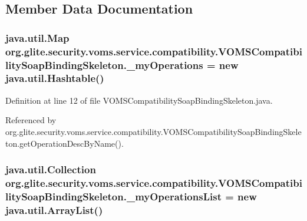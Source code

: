 \subsection{Member Data Documentation}
\hypertarget{classorg_1_1glite_1_1security_1_1voms_1_1service_1_1compatibility_1_1VOMSCompatibilitySoapBindingSkeleton_a64389624da6e025d110bdf5b8494820b}{
\subsubsection[{\_\-myOperations}]{\setlength{\rightskip}{0pt plus 5cm}java.util.Map {\bf org.glite.security.voms.service.compatibility.VOMSCompatibilitySoapBindingSkeleton.\_\-myOperations} = new java.util.Hashtable()}}
\label{classorg_1_1glite_1_1security_1_1voms_1_1service_1_1compatibility_1_1VOMSCompatibilitySoapBindingSkeleton_a64389624da6e025d110bdf5b8494820b}


Definition at line 12 of file VOMSCompatibilitySoapBindingSkeleton.java.



Referenced by org.glite.security.voms.service.compatibility.VOMSCompatibilitySoapBindingSkeleton.getOperationDescByName().

\hypertarget{classorg_1_1glite_1_1security_1_1voms_1_1service_1_1compatibility_1_1VOMSCompatibilitySoapBindingSkeleton_ac973db4cd89cadbb48c3fd8179b575c4}{
\subsubsection[{\_\-myOperationsList}]{\setlength{\rightskip}{0pt plus 5cm}java.util.Collection {\bf org.glite.security.voms.service.compatibility.VOMSCompatibilitySoapBindingSkeleton.\_\-myOperationsList} = new java.util.ArrayList()}}
\label{classorg_1_1glite_1_1security_1_1voms_1_1service_1_1compatibility_1_1VOMSCompatibilitySoapBindingSkeleton_ac973db4cd89cadbb48c3fd8179b575c4}


